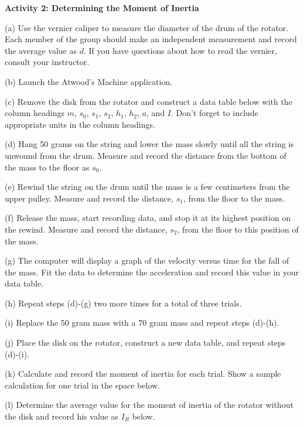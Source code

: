 \textbf{Activity 2: Determining the Moment of Inertia }

(a) Use the vernier caliper to measure the diameter of the drum of the rotator.
Each member of the group should make an independent measurement and record the
average value as $d$. If you have questions about how to read the vernier, consult
your instructor.
\vspace{10mm}

(b) Launch the Atwood's Machine application.

(c) Remove the disk from the rotator and construct a data table below with the
column headings $m$, \( s_{0} \), \( s_{1} \), \( s_{2} \), \( h_{1} \), 
\( h_{2} \),
$a$, and $I$. Don't forget to include appropriate units in the column headings.
\vspace{100mm}

(d) Hang 50 grams on the string and lower the mass slowly until all the string
is unwound from the drum. Measure and record the distance from the bottom of
the mass to the floor as \( s_{0} \).

(e) Rewind the string on the drum until the mass is a few centimeters from the
upper pulley. Measure and record the distance, \( s_{1} \), from the floor
to the mass.

(f) Release the mass, start recording data, and stop it at its highest position
on the rewind. Measure and record the distance, \( s_{2} \), from the floor
to this position of the mass.

(g) The computer will display a graph of the velocity versus time for the fall
of the mass. Fit the data to determine the acceleration and record this value
in your data table.

(h) Repeat steps (d)-(g) two more times for a total of three trials.

(i) Replace the 50 gram mass with a 70 gram mass and repeat steps (d)-(h).

(j) Place the disk on the rotator, construct a new data table, and repeat steps
(d)-(i).
\vspace{100mm}

(k) Calculate and record the moment of inertia for each trial. Show a sample
calculation for one trial in the space below.
\vspace{30mm}

(l) Determine the average value for the moment of inertia of the rotator without
the disk and record his value as \( I_{R} \) below.
\vspace{10mm}

